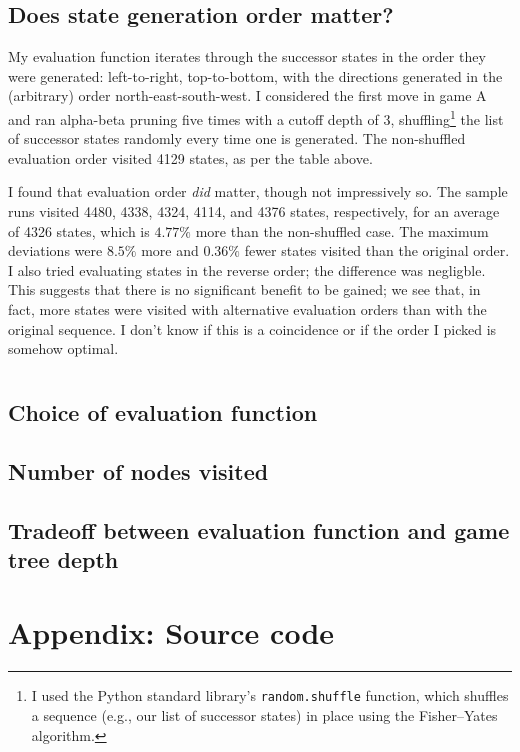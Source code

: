 \documentclass[letterpaper, 12pt]{article}
\numberwithin{theorem}{section}
\begin{document}
\subsection{Does state generation order matter?}
My evaluation function iterates through the successor states in the order they were generated: left-to-right, top-to-bottom, with the directions generated in the (arbitrary) order north-east-south-west. I considered the first move in game A and ran alpha-beta pruning five times with a cutoff depth of 3, shuffling\footnote{I used the Python standard library's \texttt{random.shuffle} function, which shuffles a sequence (e.g., our list of successor states) in place using the Fisher--Yates algorithm.} the list of successor states randomly every time one is generated. The non-shuffled evaluation order visited 4129 states, as per the table above. 

I found that evaluation order \emph{did} matter, though not impressively so. The sample runs visited 4480, 4338, 4324, 4114, and 4376 states, respectively, for an average of 4326 states, which is $4.77\%$ more than the non-shuffled case. The maximum deviations were $8.5\%$ more and $0.36\%$ fewer states visited than the original order. I also tried evaluating states in the reverse order; the difference was negligble. This suggests that there is no significant benefit to be gained; we see that, in fact, more states were visited with alternative evaluation orders than with the original sequence. I don't know if this is a coincidence or if the order I picked is somehow optimal.


\section{}
\subsection{Choice of evaluation function}

\subsection{Number of nodes visited}

\subsection{Tradeoff between evaluation function and game tree depth}


\clearpage
\appendix
\section{Appendix: Source code}
\end{document}
